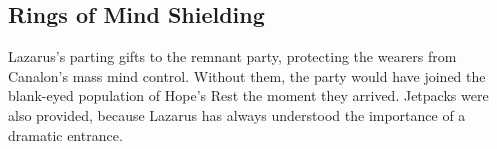 \smallskip

\subsection*{Rings of Mind Shielding}

\noindent

Lazarus's parting gifts to the remnant party, protecting the wearers from Canalon's mass mind control.  Without them, the party would have joined the blank-eyed population of Hope's Rest the moment they arrived.  Jetpacks were also provided, because Lazarus has always understood the importance of a dramatic entrance.

\smallskip

\clearpage